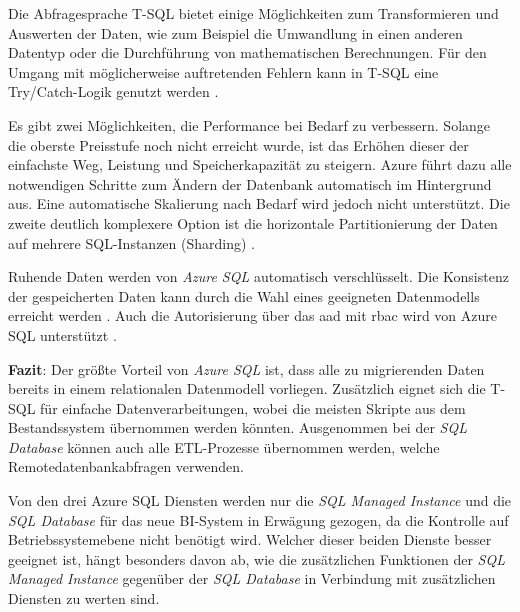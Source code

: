 Die Abfragesprache T-SQL bietet einige Möglichkeiten zum Transformieren und Auswerten der Daten, wie zum Beispiel die Umwandlung in einen anderen Datentyp oder die Durchführung von mathematischen Berechnungen. Für den Umgang mit möglicherweise auftretenden Fehlern kann in T-SQL eine Try/Catch-Logik genutzt werden \cite[vgl.][]{kellenberger_beginning_2021}.

Es gibt zwei Möglichkeiten, die Performance bei Bedarf zu verbessern. Solange die oberste Preisstufe noch nicht erreicht wurde, ist das Erhöhen dieser der einfachste Weg, Leistung und Speicherkapazität zu steigern. Azure führt dazu alle notwendigen Schritte zum Ändern der Datenbank automatisch im Hintergrund aus. Eine automatische Skalierung nach Bedarf wird jedoch nicht unterstützt. Die zweite deutlich komplexere Option ist die horizontale Partitionierung der Daten auf mehrere SQL-Instanzen (Sharding) \cite{reagan_web_2018}.

Ruhende Daten werden von \textit{Azure SQL} automatisch verschlüsselt. Die Konsistenz der gespeicherten Daten kann durch die Wahl eines geeigneten Datenmodells erreicht werden \cite{reagan_web_2018}. Auch die Autorisierung über das \ac{aad} mit \ac{rbac} wird von Azure SQL unterstützt \cite{msdoc_21_sql_authorize}.

\textbf{Fazit}: Der größte Vorteil von \textit{Azure SQL} ist, dass alle zu migrierenden Daten bereits in einem relationalen Datenmodell vorliegen. Zusätzlich eignet sich die T-SQL für einfache Datenverarbeitungen, wobei die meisten Skripte aus dem Bestandssystem übernommen werden könnten. Ausgenommen bei der \textit{SQL Database} können auch alle ETL-Prozesse übernommen werden, welche Remotedatenbankabfragen verwenden.

Von den drei Azure SQL Diensten werden nur die \textit{SQL Managed Instance} und die \textit{SQL Database} für das neue BI-System in Erwägung gezogen, da die Kontrolle auf Betriebssystemebene nicht benötigt wird. Welcher dieser beiden Dienste besser geeignet ist, hängt besonders davon ab, wie die zusätzlichen Funktionen der \textit{SQL Managed Instance} gegenüber der \textit{SQL Database} in Verbindung mit zusätzlichen Diensten zu werten sind.


